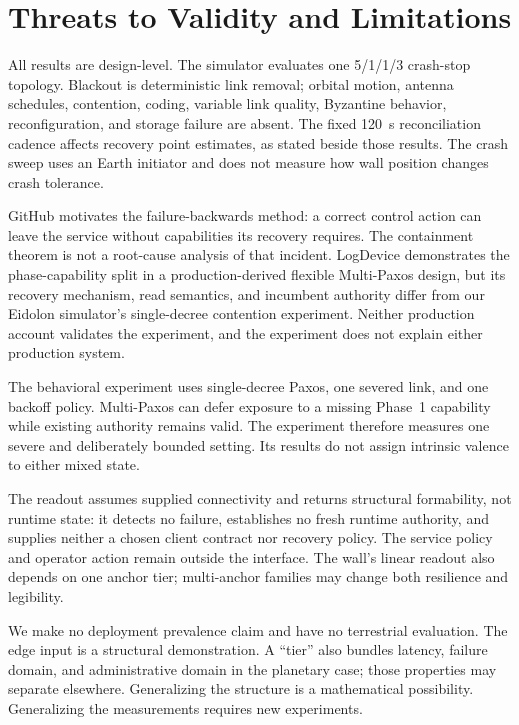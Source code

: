 \documentclass[letterpaper,twocolumn,10pt]{article}
\newcounter{prop}
\newcounter{cor}
\begin{document}
\section{Threats to Validity and Limitations}

All results are design-level. The simulator evaluates one 5/1/1/3 crash-stop topology. Blackout is deterministic link removal; orbital motion, antenna schedules, contention, coding, variable link quality, Byzantine behavior, reconfiguration, and storage failure are absent. The fixed 120~s reconciliation cadence affects recovery point estimates, as stated beside those results. The crash sweep uses an Earth initiator and does not measure how wall position changes crash tolerance.

GitHub motivates the failure-backwards method: a correct control action can leave the service without capabilities its recovery requires. The containment theorem is not a root-cause analysis of that incident. LogDevice demonstrates the phase-capability split in a production-derived flexible Multi-Paxos design, but its recovery mechanism, read semantics, and incumbent authority differ from our Eidolon simulator's single-decree contention experiment. Neither production account validates the experiment, and the experiment does not explain either production system.

The behavioral experiment uses single-decree Paxos, one severed link, and one backoff policy. Multi-Paxos can defer exposure to a missing Phase~1 capability while existing authority remains valid. The experiment therefore measures one severe and deliberately bounded setting. Its results do not assign intrinsic valence to either mixed state.

The readout assumes supplied connectivity and returns structural formability, not runtime state: it detects no failure, establishes no fresh runtime authority, and supplies neither a chosen client contract nor recovery policy. The service policy and operator action remain outside the interface. The wall's linear readout also depends on one anchor tier; multi-anchor families may change both resilience and legibility.

We make no deployment prevalence claim and have no terrestrial evaluation. The edge input is a structural demonstration. A ``tier'' also bundles latency, failure domain, and administrative domain in the planetary case; those properties may separate elsewhere. Generalizing the structure is a mathematical possibility. Generalizing the measurements requires new experiments.
\end{document}
